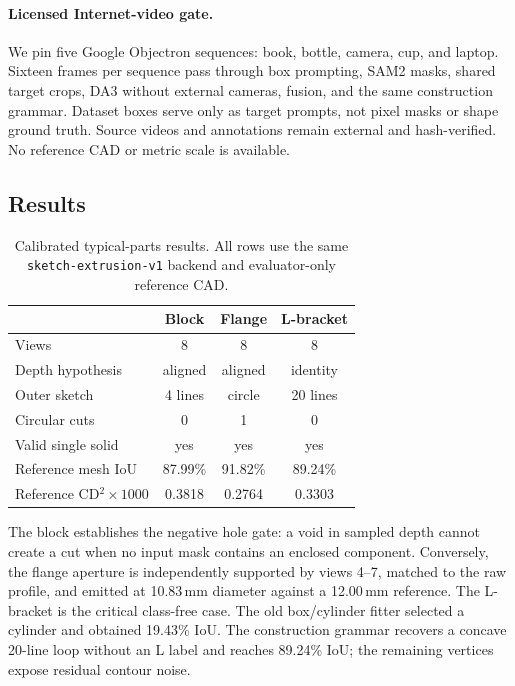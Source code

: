 \documentclass[10pt]{article}
\begin{document}
\paragraph{Licensed Internet-video gate.}
We pin five Google Objectron sequences\cite{ahmadyan2021objectron}: book,
bottle, camera, cup, and laptop.  Sixteen frames per sequence pass through box
prompting, SAM2 masks, shared target crops, DA3 without external cameras, fusion,
and the same construction grammar.  Dataset boxes serve only as target prompts,
not pixel masks or shape ground truth.  Source videos and annotations remain
external and hash-verified.  No reference CAD or metric scale is available.

\subsection{Results}

\begin{table}[t]
\centering
\caption{Calibrated typical-parts results.  All rows use the same
\texttt{sketch-extrusion-v1} backend and evaluator-only reference CAD.}
\label{tab:results}
\begin{tabular}{@{}lccc@{}}
\toprule
 & Block & Flange & L-bracket \\
\midrule
Views & 8 & 8 & 8 \\
Depth hypothesis & aligned & aligned & identity \\
Outer sketch & 4 lines & circle & 20 lines \\
Circular cuts & 0 & 1 & 0 \\
Valid single solid & yes & yes & yes \\
Reference mesh IoU & 87.99\% & 91.82\% & 89.24\% \\
Reference CD$^2\times1000$ & 0.3818 & 0.2764 & 0.3303 \\
\bottomrule
\end{tabular}
\end{table}

The block establishes the negative hole gate: a void in sampled depth cannot
create a cut when no input mask contains an enclosed component.  Conversely,
the flange aperture is independently supported by views 4--7, matched to the
raw profile, and emitted at 10.83\,mm diameter against a 12.00\,mm reference.
The L-bracket is the critical class-free case.  The old box/cylinder fitter
selected a cylinder and obtained 19.43\% IoU.  The construction grammar
recovers a concave 20-line loop without an L label and reaches 89.24\% IoU;
the remaining vertices expose residual contour noise.
\end{document}
